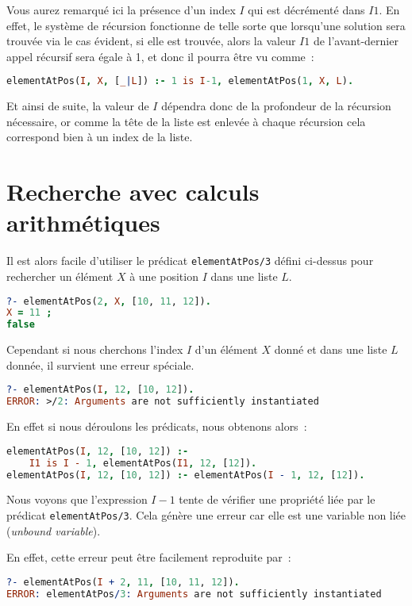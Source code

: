 Vous aurez remarqué ici la présence d'un index $I$ qui est décrémenté dans $I1$. En effet, le système de récursion fonctionne de telle sorte que lorsqu'une solution sera trouvée via le cas évident, si elle est trouvée, alors la valeur $I1$ de l'avant-dernier appel récursif sera égale à 1, et donc il pourra être vu comme~:
\begin{lstlisting}[language=Prolog,frame=single]
elementAtPos(I, X, [_|L]) :- 1 is I-1, elementAtPos(1, X, L).
\end{lstlisting}
Et ainsi de suite, la valeur de $I$ dépendra donc de la profondeur de la récursion nécessaire,
or comme la tête de la liste est enlevée à chaque récursion cela correspond bien à un index de la liste.

\section{Recherche avec calculs arithmétiques}

Il est alors facile d'utiliser le prédicat \texttt{elementAtPos/3} défini ci-dessus pour rechercher un élément $X$ à une position $I$ dans une liste $L$.
\begin{lstlisting}[language=Prolog,frame=single]
?- elementAtPos(2, X, [10, 11, 12]).
X = 11 ;
false
\end{lstlisting}

Cependant si nous cherchons l'index $I$ d'un élément
$X$ donné et dans une liste $L$ donnée, il survient une erreur spéciale.
\begin{lstlisting}[language=Prolog,frame=single]
?- elementAtPos(I, 12, [10, 12]).
ERROR: >/2: Arguments are not sufficiently instantiated
\end{lstlisting}

En effet si nous déroulons les prédicats, nous obtenons alors~:
\begin{lstlisting}[language=Prolog,frame=single]
elementAtPos(I, 12, [10, 12]) :-
    I1 is I - 1, elementAtPos(I1, 12, [12]).
elementAtPos(I, 12, [10, 12]) :- elementAtPos(I - 1, 12, [12]).
\end{lstlisting}

Nous voyons que l'expression $I - 1$ tente de vérifier une propriété liée par le prédicat
\texttt{elementAtPos/3}. Cela génère une erreur car elle est une variable non liée (\textit{unbound variable}).

En effet, cette erreur peut être facilement reproduite par~:
\begin{lstlisting}[language=Prolog,frame=single]
?- elementAtPos(I + 2, 11, [10, 11, 12]).
ERROR: elementAtPos/3: Arguments are not sufficiently instantiated
\end{lstlisting}
